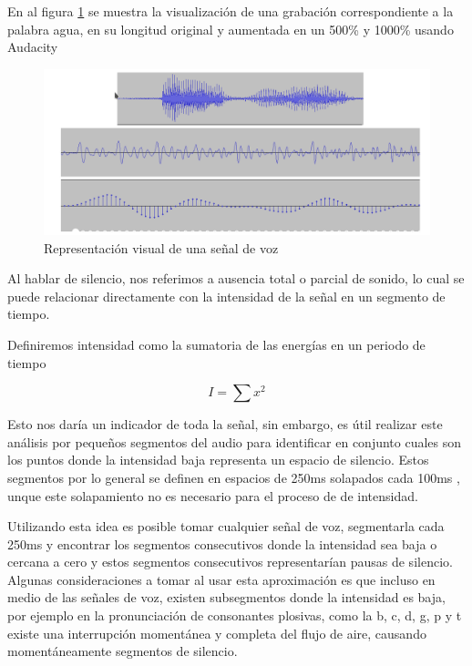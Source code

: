 En al figura \ref{img:pcm} se muestra la visualización de una grabación correspondiente a la palabra agua, en su longitud original y aumentada en un 500\% y 1000\% usando Audacity \cite{audacity}
\begin{figure}[H]
\caption{Representación visual de una señal de voz \cite{hableomsDeVoz}}
\label{img:pcm}
\includegraphics[width=\textwidth]{imagenes/04_01_pcm.png}
\end{figure}

Al hablar de silencio, nos referimos a ausencia total o parcial de sonido, lo cual se puede relacionar directamente con la intensidad de la señal en un segmento de tiempo.

Definiremos intensidad como la sumatoria de las energías en un periodo de tiempo  \cite{Jurafsky2000SpeechRecognition}    

\begin{equation}
\label{eq:energy}
I = \sum{x^2}  
\end{equation}

Esto nos daría un indicador de  toda la señal, sin embargo, es útil realizar este análisis por pequeños segmentos del audio para identificar en conjunto cuales son los puntos donde la intensidad baja representa un espacio de silencio. Estos segmentos por lo general se definen en espacios de 250ms solapados cada 100ms ,  unque este solapamiento no es necesario para el proceso de  de intensidad.

Utilizando esta idea es posible tomar cualquier señal de voz, segmentarla cada 250ms y encontrar los segmentos consecutivos donde la intensidad sea baja o cercana a cero y estos segmentos consecutivos representarían pausas de silencio. Algunas consideraciones a tomar al usar esta aproximación es que incluso en medio de las señales de voz, existen subsegmentos donde la intensidad es baja, por ejemplo en la pronunciación de consonantes plosivas, como la b, c, d, g, p y t existe una interrupción momentánea y completa del flujo de aire, causando momentáneamente segmentos de silencio.

